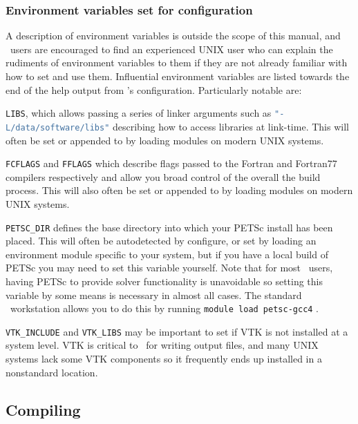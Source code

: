\subsubsection{Environment variables set for configuration}
\label{sec:configure_environment_vars}

A description of environment variables is outside the scope of this manual, and
\fluidity\ users are encouraged to find an experienced UNIX user who can explain
the rudiments of environment variables to them if they are not already familiar
with how to set and use them. Influential environment variables are listed
towards the end of the help output from \fluidity's configuration. Particularly
notable are:

\lstinline[language=Bash]+LIBS+, which allows passing a series of linker
arguments such as \lstinline[language=Bash]+"-L/data/software/libs"+ describing
how to access libraries at link-time. This will often be set or appended to by
loading modules on modern UNIX systems.

\lstinline[language=Bash]+FCFLAGS+ and \lstinline[language=Bash]+FFLAGS+ which
describe flags passed to the Fortran and Fortran77 compilers respectively and
allow you broad control of the overall the build process. This will also often
be set or appended to by loading modules on modern UNIX systems.

\lstinline[language=Bash]+PETSC_DIR+ defines the base directory into which your
PETSc install has been placed. This will often be autodetected by configure, or
set by loading an environment module specific to your system, but if you have a
local build of PETSc you may need to set this variable yourself. Note that for
most \fluidity\ users, having PETSc to provide solver functionality is
unavoidable so setting this variable by some means is necessary in almost all
cases. The standard \fluidity\ workstation allows you to do this by running
\lstinline[language=Bash]+module load petsc-gcc4+ .

\lstinline[language=Bash]+VTK_INCLUDE+ and \lstinline[language=Bash]+VTK_LIBS+
may be important to set if VTK is not installed at a system level. VTK is
critical to \fluidity\ for writing output files, and many UNIX systems lack some
VTK components so it frequently ends up installed in a nonstandard location.

\subsection{Compiling \fluidity}
\label{sec:compiling_fluidity}

